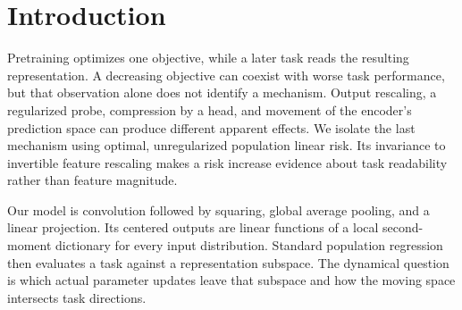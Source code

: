 \begin{abstract}
Pretraining can make the encoder itself less readable while its objective improves. We identify a mechanism: redistribution of readable directions at preserved rank. For convolution, squaring, and global pooling, local second moments give an exact feature dictionary. Correlated filters and head coupling move the encoder's prediction space even under an isotropic objective. In an explicit joint parameter gradient flow with a genuine encoder bottleneck, a prespecified task cone uniformly improves and then exceeds its initial risk, for both encoder and projection. The encoder increase rules out head selection as the sole cause; optimal unregularized population probes remove finite-label fitting and invertible feature scaling as explanations. A quantitative stability theorem preserves positive gaps under independent perturbations of all six initialization coordinates in a small explicit neighborhood. Fifty paired texture seeds show complete encoder rebound under both square and linear training; observed task-wise frequencies depend on the architecture and comparison rule, excluding architecture exclusivity. CIFAR moment-task rebound recurs in one of five new seeds at fixed windows. At fixed late encoders, same-width supervised heads recover $97.6\%$ of the original head-to-encoder test-MSE gap, distinguishing head selection from encoder readability. These results identify how continued pretraining can rotate a fixed-dimensional encoder space away from task-relevant directions.
\end{abstract}

\section{Introduction}
\label{main:introduction}
Pretraining optimizes one objective, while a later task reads the resulting representation. A decreasing objective can coexist with worse task performance, but that observation alone does not identify a mechanism. Output rescaling, a regularized probe, compression by a head, and movement of the encoder's prediction space can produce different apparent effects. We isolate the last mechanism using optimal, unregularized population linear risk. Its invariance to invertible feature rescaling makes a risk increase evidence about task readability rather than feature magnitude.

Our model is convolution followed by squaring, global average pooling, and a linear projection. Its centered outputs are linear functions of a local second-moment dictionary for every input distribution. Standard population regression then evaluates a task against a representation subspace. The dynamical question is which actual parameter updates leave that subspace and how the moving space intersects task directions.


